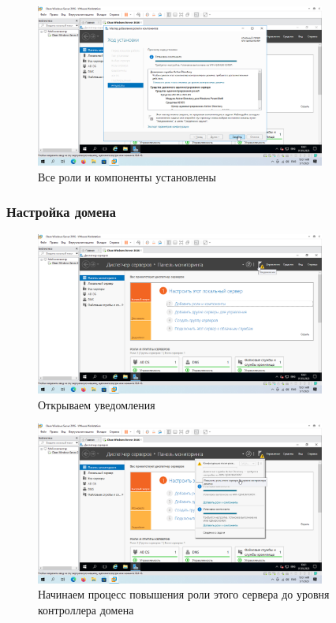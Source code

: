 \documentclass[a4paper]{article}
\begin{document}
  \begin{figure}[H]
    \centering
    \includegraphics[width=0.85\textwidth]{9_0049}
    \caption{Все роли и компоненты установлены}
    \label{img:0049}
  \end{figure}

  \subsubsection{Настройка домена}

  \begin{figure}[H]
    \centering
    \includegraphics[width=0.85\textwidth]{9_0050}
    \caption{Открываем уведомления}
    \label{img:0050}
  \end{figure}

  \begin{figure}[H]
    \centering
    \includegraphics[width=0.85\textwidth]{9_0051}
    \caption{Начинаем процесс повышения роли этого сервера до уровня контроллера домена}
    \label{img:0051}
  \end{figure}
\end{document}
